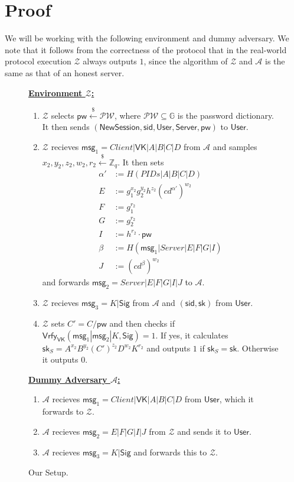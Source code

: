 \documentclass[12pt,a4paper]{article}
\newcommand{\env}{\mathcal{Z}}
\newcommand{\adv}{\mathcal{A}}
\newcommand{\user}{\mathsf{User}}
\newcommand{\sk}{\mathsf{sk}}
\newcommand{\pw}{\mathsf{pw}}
\newcommand{\newsession}{\mathsf{NewSession}}
\newcommand{\server}{\mathsf{Server}}
\newcommand{\msg}[1]{\mathsf{msg}_{#1}}
\begin{document}
	\section{Proof}
	
	We will be working with the following environment and dummy adversary. We note that it follows from the correctness of the protocol that in the real-world protocol execution $\env$ always outputs $1$, since the algorithm of $\env$ and $\adv$ is the same as that of an honest server.\\
	
	\begin{figure}[h]
		\begin{framed}[
			]
			\vspace{2mm}
			\textbf{\underline{Environment $\env$:}}
			\begin{enumerate}
				\item $\env$ selects $\pw\xleftarrow{\$}\mathcal{PW}$, where $\mathcal{PW}\subseteq\mathbb{G}$ is the password dictionary. It then sends $(\newsession,\mathsf{sid},\user,\server,\pw)$ to $\user$.
				\item $\env$ recieves $\msg{1} = Client|\mathsf{VK}|A|B|C|D$ from $\adv$ and samples $x_2, y_2, z_2, w_2, r_2\xleftarrow{\$}\mathbb{Z}_q$. It then sets 
				\begin{align*}
					\alpha'&:=H(PIDs|A|B|C|D)\\
					E &:= g_1^{x_2}g_2^{y_2}h^{z_2}(cd^{\alpha'})^{w_2}\\
					F &:= g_1^{r_2}\\
					G &:= g_2^{r_2}\\
					I &:= h^{r_2}\cdot\pw\\
					\beta &:= H(\msg{1}|Server|E|F|G|I)\\
					J &:= (cd^{\beta})^{w_2}
				\end{align*}
			and forwards $\msg{2} = Server|E|F|G|I|J$ to $\adv$.
			\item $\env$ recieves $\msg{3}=K|\mathsf{Sig}$ from $\adv$ and $(\mathsf{sid}, \sk)$ from $\user$.
			\item $\env$ sets $C'=C/\pw$ and then checks if $\mathsf{Vrfy}_{\mathsf{VK}}(\msg{1}|\msg{2}|K,\mathsf{Sig})=1$. If yes, it calculates $\sk_S=A^{x_2}B^{y_2}(C')^{z_2}D^{w_2}K^{r_2}$ and outputs $1$ if $\sk_S=\sk$. Otherwise it outputs $0$.
			\end{enumerate}
			\textbf{\underline{Dummy Adversary $\adv$:}}
			\begin{enumerate}
				\item $\adv$ recieves $\msg{1} = Client|\mathsf{VK}|A|B|C|D$ from $\user$, which it forwards to $\env$.
				\item $\adv$ recieves $\msg{2}=E|F|G|I|J$ from $\env$ and sends it to $\user$.
				\item $\adv$ recieves $\msg{3}=K|\mathsf{Sig}$ and forwards this to $\env$.
			\end{enumerate}
			\vspace{2mm}
		\end{framed}
		\caption{Our Setup.}
		\label{fig:adv}
	\end{figure}
	
\end{document}
